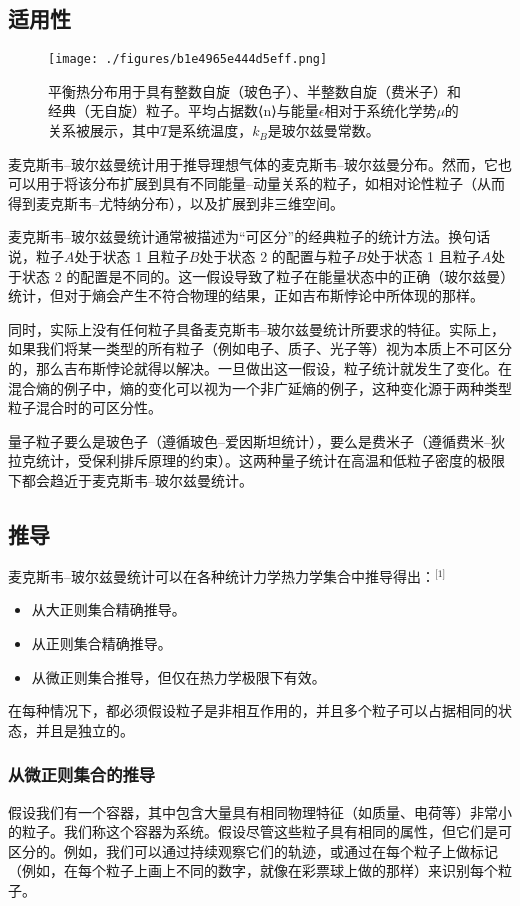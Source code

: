 \subsection{适用性}
\begin{figure}[ht]
\centering
\texttt{[image: ./figures/b1e4965e444d5eff.png]}
\caption{平衡热分布用于具有整数自旋（玻色子）、半整数自旋（费米子）和经典（无自旋）粒子。平均占据数⟨n⟩与能量\(\epsilon\)相对于系统化学势\(\mu\)的关系被展示，其中\(T\)是系统温度，\(k_B\)是玻尔兹曼常数。} \label{fig_MBTJ_2}
\end{figure}
麦克斯韦–玻尔兹曼统计用于推导理想气体的麦克斯韦–玻尔兹曼分布。然而，它也可以用于将该分布扩展到具有不同能量–动量关系的粒子，如相对论性粒子（从而得到麦克斯韦–尤特纳分布），以及扩展到非三维空间。

麦克斯韦–玻尔兹曼统计通常被描述为“可区分”的经典粒子的统计方法。换句话说，粒子\(A\)处于状态 1 且粒子\(B\)处于状态 2 的配置与粒子\(B\)处于状态 1 且粒子\(A\)处于状态 2 的配置是不同的。这一假设导致了粒子在能量状态中的正确（玻尔兹曼）统计，但对于熵会产生不符合物理的结果，正如吉布斯悖论中所体现的那样。

同时，实际上没有任何粒子具备麦克斯韦–玻尔兹曼统计所要求的特征。实际上，如果我们将某一类型的所有粒子（例如电子、质子、光子等）视为本质上不可区分的，那么吉布斯悖论就得以解决。一旦做出这一假设，粒子统计就发生了变化。在混合熵的例子中，熵的变化可以视为一个非广延熵的例子，这种变化源于两种类型粒子混合时的可区分性。

量子粒子要么是玻色子（遵循玻色–爱因斯坦统计），要么是费米子（遵循费米–狄拉克统计，受保利排斥原理的约束）。这两种量子统计在高温和低粒子密度的极限下都会趋近于麦克斯韦–玻尔兹曼统计。
\subsection{推导}  
麦克斯韦–玻尔兹曼统计可以在各种统计力学热力学集合中推导得出：\(^\text{[1]}\)
\begin{itemize}
\item 从大正则集合精确推导。
\item 从正则集合精确推导。
\item 从微正则集合推导，但仅在热力学极限下有效。
\end{itemize}
在每种情况下，都必须假设粒子是非相互作用的，并且多个粒子可以占据相同的状态，并且是独立的。
\subsubsection{从微正则集合的推导}
假设我们有一个容器，其中包含大量具有相同物理特征（如质量、电荷等）非常小的粒子。我们称这个容器为系统。假设尽管这些粒子具有相同的属性，但它们是可区分的。例如，我们可以通过持续观察它们的轨迹，或通过在每个粒子上做标记（例如，在每个粒子上画上不同的数字，就像在彩票球上做的那样）来识别每个粒子。

